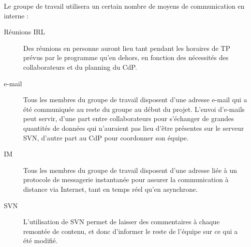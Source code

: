 Le groupe de travail utilisera un certain nombre de moyens de communication en interne :
\begin{description}
\item[Réunions IRL]{Des réunions en personne auront lieu tant pendant les horaires de TP prévus par le programme qu'en dehors, en fonction des nécessités des collaborateurs et du planning du CdP.}
\item[e-mail]{Tous les membres du groupe de travail disposent d'une adresse e-mail qui a été communiquée au reste du groupe au début du projet. L'envoi d'e-mails peut servir, d'une part entre collaborateurs pour s'échanger de grandes quantités de données qui n'auraient pas lieu d'être présentes sur le serveur SVN, d'autre part au CdP pour coordonner son équipe.}
\item[IM]{Tous les membres du groupe de travail disposent d'une adresse liée à un protocole de messagerie instantanée pour assurer la communication à distance via Internet, tant en temps réel qu'en asynchrone.}
\item[SVN]{L'utilisation de SVN permet de laisser des commentaires à chaque remontée de contenu, et donc d'informer le reste de l'équipe sur ce qui a été modifié.}
\end{description}